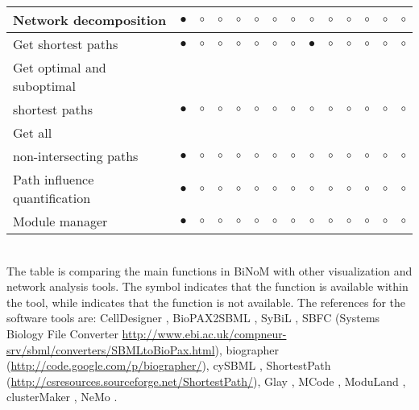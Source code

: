 \documentclass[11pt]{bmc_article_s50}
\newenvironment{bmcformat}{\begin{raggedright}\baselineskip20pt\sloppy\setboolean{publ}{false}}{\end{raggedright}\baselineskip20pt\sloppy}
\begin{document}
\begin{bmcformat}
\begin{sidewaystable}
\begin{tabular}{lccccccccccccc}
        Network decomposition & $\bullet$      &$\circ$&$\circ$& $\circ$      & $\circ$       & $\circ$           & $\circ$     & $\circ$               &  $\circ$      &  $\circ$       &  $\circ$           & $\circ$            &  $\circ$      \\ \hline
        Get shortest paths    & $\bullet$      &$\circ$&$\circ$& $\circ$      & $\circ$       & $\circ$           & $\circ$     & $\bullet$               &  $\circ$      &  $\circ$       &  $\circ$           & $\circ$            &  $\circ$      \\ \hline
        Get optimal and suboptimal & & & & & & & & & & & & &
          \\shortest paths    & $\bullet$      &$\circ$&$\circ$& $\circ$      & $\circ$       & $\circ$           & $\circ$     & $\circ$               &  $\circ$      &  $\circ$       &  $\circ$           & $\circ$            &  $\circ$      \\ \hline
        Get all  & & & & & & & & & & & & &
          \\non-intersecting paths    & $\bullet$      &$\circ$&$\circ$& $\circ$      & $\circ$       & $\circ$           & $\circ$     & $\circ$               &  $\circ$      &  $\circ$       &  $\circ$           & $\circ$            &  $\circ$      \\ \hline
        Path influence quantification & $\bullet$      &$\circ$&$\circ$& $\circ$      & $\circ$       & $\circ$           & $\circ$     & $\circ$               &  $\circ$      &  $\circ$       &  $\circ$           & $\circ$            &  $\circ$      \\ \hline
        Module manager       & $\bullet$      &$\circ$&$\circ$& $\circ$      & $\circ$       & $\circ$           & $\circ$     & $\circ$               &  $\circ$      &  $\circ$       &  $\circ$           & $\circ$            &  $\circ$      \\
        \hline
      \end{tabular}\\
 The table is comparing the main functions in BiNoM with other visualization
 and network analysis tools. The symbol \bullet indicates that the function is
 available within the tool, while \circ indicates that the function is not
 available. The references for the software tools are: CellDesigner
 \cite{funahashi2003celldesigner, mi2011biopax}, BioPAX2SBML
 \cite{buchel2012qualitative}, SyBiL  \cite{ruebenacker2009integrating}, SBFC
 (Systems Biology File Converter
 \url{http://www.ebi.ac.uk/compneur-srv/sbml/converters/SBMLtoBioPax.html}),
 biographer (\url{http://code.google.com/p/biographer/}), cySBML
 \cite{konig2012cysbml}, ShortestPath
 (\url{http://csresources.sourceforge.net/ShortestPath/}), Glay
 \cite{su2010glay}, MCode \cite{bader2003automated}, ModuLand
 \cite{szalay2012moduland}, clusterMaker \cite{morris2011clustermaker}, NeMo
 \cite{rivera2010nemo}.


\end{sidewaystable}
\end{bmcformat}
\end{document}
